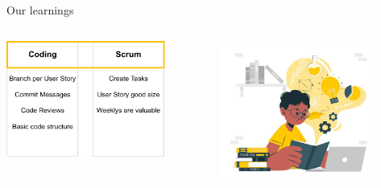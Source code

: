 \documentclass[
    ngerman,%
    authorontitle=true,
]{bfhbeamer}
\begin{document}
    \begin{frame}{Our learnings}
        \begin{columns}
            \begin{column}{0.5\textwidth}
                \begin{center}
                    \includegraphics[width=0.8\textwidth]{pictures/scrum_adaptions-learnings}
                \end{center}
            \end{column}
            \begin{column}{0.5\textwidth}
                \begin{center}
                    \includegraphics[width=0.8\textwidth]{pictures/Learnings}
                \end{center}
            \end{column}
        \end{columns}
    \end{frame}
\end{document}
